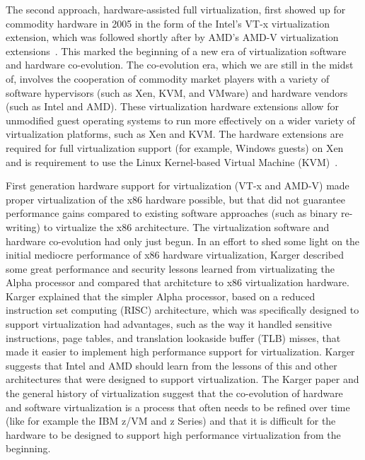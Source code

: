 The second approach, hardware-assisted full virtualization, first showed up for commodity hardware in 2005 in the form of the Intel's VT-x virtualization extension, which was followed shortly after by AMD's AMD-V virtualization extensions~\cite{van_Doorn_2006}. This marked the beginning of a new era of virtualization software and hardware co-evolution. The co-evolution era, which we are still in the midst of, involves the cooperation of commodity market players with a variety of software hypervisors (such as Xen, KVM, and VMware) and hardware vendors (such as Intel and AMD). These virtualization hardware extensions allow for unmodified guest operating systems to run more effectively on a wider variety of virtualization platforms, such as Xen and KVM. The hardware extensions are required for full virtualization support (for example, Windows guests) on Xen and is requirement to use the Linux Kernel-based Virtual Machine (KVM)~\cite{kvm_ols07}.

First generation hardware support for virtualization (VT-x and AMD-V) made proper virtualization\cite{popek_1974} of the x86 hardware possible, but that did not guarantee performance gains compared to existing software approaches (such as binary re-writing) to virtualize the x86 architecture\cite{adams_2006}. The virtualization software and hardware co-evolution had only just begun. In an effort to shed some light on the initial mediocre performance of x86 hardware virtualization, Karger described some great performance and security lessons learned from virtualizating the Alpha processor and compared that architcture to x86 virtualization hardware\cite{karger_2007}. Karger explained that the simpler Alpha processor, based on a reduced instruction set computing (RISC) architecture, which was specifically designed to support virtualization had advantages, such as the way it handled sensitive instructions, page tables, and translation lookaside buffer (TLB) misses, that made it easier to implement high performance support for virtualization. Karger suggests that Intel and AMD should learn from the lessons of this and other architectures that were designed to support virtualization. The Karger paper and the general history of virtualization suggest that the co-evolution of hardware and software virtualization is a process that often needs to be refined over time (like for example the IBM z/VM and z Series) and that it is difficult for the hardware to be designed to support high performance virtualization from the beginning.

